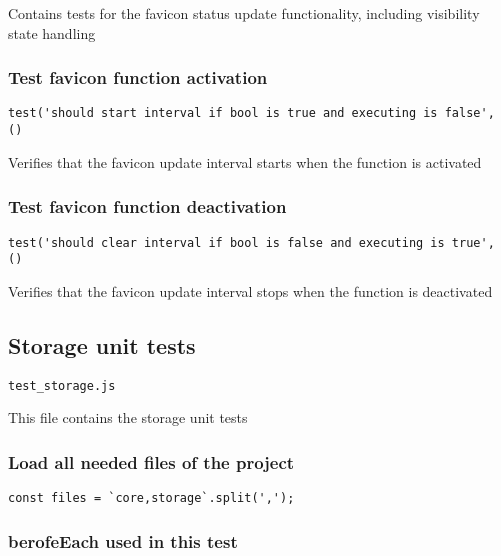 \documentclass[a4paper]{article}
\begin{document}
Contains tests for the favicon status update functionality,
including visibility state handling

\hypertarget{toc690}{}
\subsubsection{Test favicon function activation}

\begin{lstlisting}
test('should start interval if bool is true and executing is false', ()
\end{lstlisting}

Verifies that the favicon update interval starts when
the function is activated

\hypertarget{toc691}{}
\subsubsection{Test favicon function deactivation}

\begin{lstlisting}
test('should clear interval if bool is false and executing is true', ()
\end{lstlisting}

Verifies that the favicon update interval stops when
the function is deactivated

\hypertarget{toc692}{}
\subsection{Storage unit tests}

\begin{lstlisting}
test_storage.js
\end{lstlisting}

This file contains the storage unit tests

\hypertarget{toc693}{}
\subsubsection{Load all needed files of the project}

\begin{lstlisting}
const files = `core,storage`.split(',');
\end{lstlisting}

\hypertarget{toc694}{}
\subsubsection{berofeEach used in this test}
\end{document}
